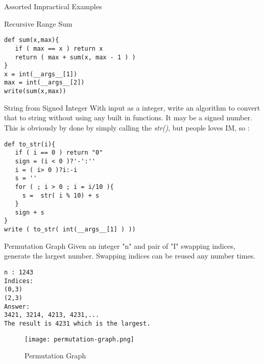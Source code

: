 \begin{section}{Assorted Impractical Examples}
\begin{subsection}{Recursive Range Sum}
\begin{center}\begin{minipage}{\linewidth}
\begin{lstlisting}[style=JexlStyle]
def sum(x,max){
   if ( max == x ) return x
   return ( max + sum(x, max - 1 ) )
}
x = int(__args__[1])
max = int(__args__[2])
write(sum(x,max))
\end{lstlisting}  
\end{minipage}\end{center}

\end{subsection}

\begin{subsection}{String from Signed Integer}
With input as a integer, write an algorithm to convert that to string 
without using any built in functions. It may be a signed number. 
This is obviously by done by simply calling the \emph{str()}, 
but people loves IM, so :

\begin{center}\begin{minipage}{\linewidth}
\begin{lstlisting}[style=JexlStyle]
def to_str(i){
   if ( i == 0 ) return "0"
   sign = (i < 0 )?'-':''
   i = ( i> 0 )?i:-i
   s = '' 
   for ( ; i > 0 ; i = i/10 ){
     s =  str( i % 10) + s 
   } 
   sign + s    
}
write ( to_str( int(__args__[1] ) ))
\end{lstlisting}  
\end{minipage}\end{center}
\end{subsection}

\begin{subsection}{Permutation Graph}
Given an integer "n" and pair of "I" swapping indices, 
generate the largest number. Swapping indices can be reused any number times. 

\begin{center}\begin{minipage}{\linewidth}
\begin{lstlisting}[style=all]
n : 1243 
Indices: 
(0,3) 
(2,3) 
Answer: 
3421, 3214, 4213, 4231,...
The result is 4231 which is the largest.
\end{lstlisting}
\end{minipage}\end{center}
  
\begin{figure}
\begin{center}
\leavevmode
\texttt{[image: permutation-graph.png]}
\end{center}
\caption{Permutation Graph}
\label{fig_12_1}
\end{figure}
  


\end{subsection}
\end{section}
